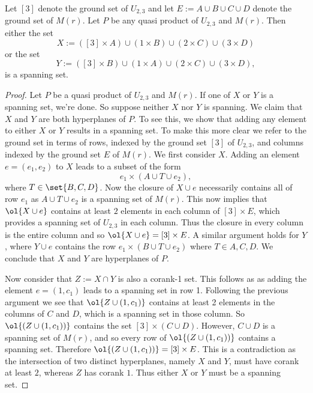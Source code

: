     \begin{proposition}\label{prop:XandY}
        Let $[3]$ denote the ground set of $U_{2,3}$ and let $E:=A\cup B\cup C\cup D$ denote the ground set of $M(r)$. Let $P$ be any quasi product of $U_{2,3}$ and $M(r)$. Then either the set
        $$X:=([3]\times A)\cup (1\times B)\cup (2\times C)\cup (3\times D)$$
        or the set
        $$Y:= ([3]\times B)\cup (1\times A)\cup (2\times C)\cup (3\times D),$$
        is a spanning set.
    \end{proposition}
    \begin{proof}
    
        Let $P$ be a quasi product of  $U_{2,3}$ and $M(r)$. If one of $X$ or $Y$ is a spanning set, we're done. So suppose neither $X$ nor $Y$ is spanning. We claim that $X$ and $Y$ are both hyperplanes of $P$. To see this, we show that adding any element to either $X$ or $Y$ results in a spanning set. To make this more clear we refer to the ground set in terms of rows, indexed by the ground set $[3]$ of $U_{2,3}$, and columns indexed by the ground set $E$ of $M(r)$. We first consider $X$. Adding an element $e=(e_1,e_2)$ to $X$ leads to a subset of the form
            $$e_1\times (A\cup T\cup e_2),$$
    where $T\in \set{B, C, D}$. Now the closure of $X\cup e$ necessarily contains all of row $e_1$ as $A\cup T\cup e_2$ is a spanning set of $M(r)$. This now implies that $\ol{X\cup e}$ contains at least $2$ elements in each column of $[3]\times E$, which provides a spanning set of $U_{2,3}$ in each column. Thus the closure in every column is the entire column and so $\ol{X\cup e}=[3]\times E$. A similar argument holds for $Y$, where $Y\cup e$ contains the row $e_1\times (B\cup T\cup e_2)$ where $T\in{A,C,D}$. We conclude that $X$ and $Y$ are hyperplanes of $P$. 

    
    Now consider that $Z:= X\cap Y$ is also a corank-1 set. This follows as as adding the element $e = (1,c_1)$ leads to a spanning set in row 1. Following the previous argument we see that $\ol{Z\cup (1,c_1)}$ contains at least 2 elements in the columns of $C$ and $D$, which is a spanning set in those column. So $\ol{(Z\cup(1,c_1))}$ contains the set $[3]\times (C\cup D)$. However, $C\cup D$ is a spanning set of $M(r)$, and so every row of $\ol{(Z\cup(1,c_1))}$ contains a spanning set. Therefore $\ol{(Z\cup(1,c_1))}= [3]\times E$. This is a contradiction as the intersection of two distinct hyperplanes, namely $X$ and $Y$, must have corank at least $2$, whereas $Z$ has corank $1$. Thus either $X$ or $Y$ must be a spanning set.
    \end{proof}
    
